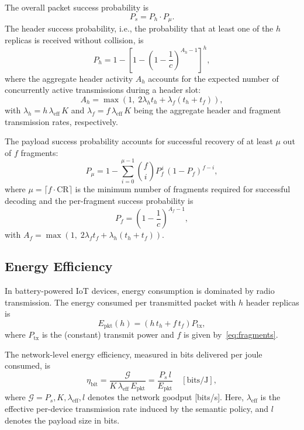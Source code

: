 \documentclass[lettersize,journal]{IEEEtran}
\begin{document}
The overall packet success probability is
\begin{equation}
    P_s = P_h \cdot P_\mu.
    \label{eq:ps}
\end{equation}
The header success probability, i.e., the probability that at least one of the $h$ replicas is received without collision, is
\begin{equation}
  P_h = 1 - \left[1 - \left(1 - \frac{1}{c}\right)^{A_h - 1}\right]^h,
  \label{eq:ph}
\end{equation}
where the aggregate header activity $A_h$ accounts for the expected number of concurrently active transmissions during a header slot:
\begin{equation}
  A_h = \max\!\left(1,\; 2\lambda_h t_h + \lambda_f (t_h + t_f)\right),
  \label{eq:ah}
\end{equation}
with $\lambda_h = h\,\lambda_{\mathrm{eff}}\,K$ and $\lambda_f = f\,\lambda_{\mathrm{eff}}\,K$ being the aggregate header and fragment transmission rates, respectively.

The payload success probability accounts for successful recovery of at least $\mu$ out of $f$ fragments:
\begin{equation}
  P_\mu = 1 - \sum_{i=0}^{\mu-1} \binom{f}{i} P_f^{\,i}\, (1 - P_f)^{f-i},
  \label{eq:pmu}
\end{equation}
where $\mu = \lceil f \cdot \mathrm{CR} \rceil$ is the minimum number of fragments required for successful decoding and the per-fragment success probability is
\begin{equation}
  P_f = \left(1 - \frac{1}{c}\right)^{A_f - 1},
  \label{eq:pf}
\end{equation}
with $A_f = \max\!\left(1,\; 2\lambda_f t_f + \lambda_h(t_h + t_f)\right)$.

\subsection{Energy Efficiency}
\label{subsec:energy}

In battery-powered \ac{IoT} devices, energy consumption is dominated by radio transmission. The energy consumed per transmitted packet with $h$ header replicas is
\begin{equation}
  E_{\mathrm{pkt}}(h) = \left(h\, t_h + f\, t_f\right) P_{\mathrm{tx}},
  \label{eq:energy_pkt}
\end{equation}
where $P_{\mathrm{tx}}$ is the (constant) transmit power and $f$ is given by~\eqref{eq:fragments}.

The network-level energy efficiency, measured in bits delivered per joule consumed, is
\begin{equation}
  \eta_{\mathrm{bit}}
  = \frac{\mathcal{G}}{K\,\lambda_{\mathrm{eff}}\,E_{\mathrm{pkt}}}
  = \frac{P_s\, l}{E_{\mathrm{pkt}}}
  \quad [\text{bits/J}],
  \label{eq:eta_bit}
\end{equation}
where $\mathcal{G} = P_s, K, \lambda_{\mathrm{eff}}, l$ denotes the network goodput [bits/s]. Here, $\lambda_{\mathrm{eff}}$ is the effective per-device transmission rate induced by the semantic policy, and $l$ denotes the payload size in bits.
\end{document}
